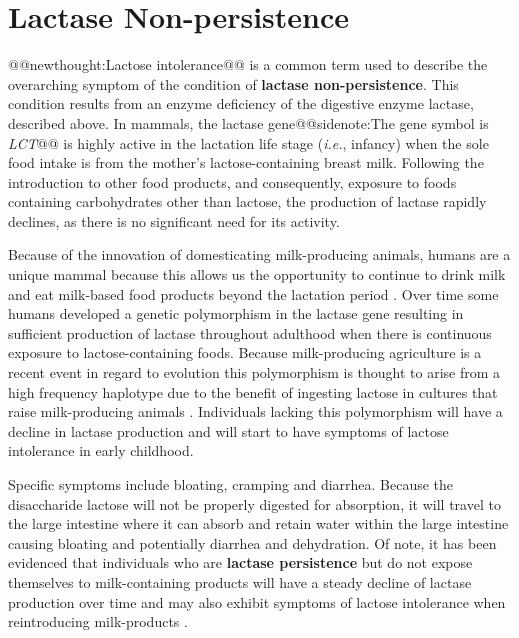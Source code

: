 \documentclass{tufte-handout}
\makeatletter
\def\newthought#1{@@newthought:#1@@}
\def\sidenote#1{@@sidenote:#1@@}
\makeatother
\begin{document}
\section{Lactase Non-persistence}

\newthought{Lactose intolerance} is a common term used to describe the overarching symptom of the condition of \textbf{lactase non-persistence}. This condition results from an enzyme deficiency of the digestive enzyme lactase, described above. In mammals, the lactase gene\sidenote{The gene symbol is \textit{LCT}} is highly active in the lactation life stage (\textit{i.e.}, infancy) when the sole food intake is from the mother's lactose-containing breast milk. Following the introduction to other food products, and consequently, exposure to foods containing carbohydrates other than lactose, the production of lactase rapidly declines, as there is no significant need for its activity.

Because of the innovation of domesticating milk-producing animals, humans are a unique mammal because this allows us the opportunity to
continue to drink milk and eat milk-based food products beyond the lactation period \citep{Itan2009}. Over time some humans developed a genetic polymorphism in the lactase gene resulting in sufficient production of lactase throughout adulthood when there is continuous exposure to lactose-containing foods. Because milk-producing agriculture is a recent event in regard to evolution this polymorphism is thought to arise from a high frequency haplotype due to the benefit of ingesting lactose in cultures that raise milk-producing animals \citep{Harvey1998,Itan2009}. Individuals lacking this polymorphism will have a decline in lactase production and will start to have symptoms of lactose intolerance in early childhood.

Specific symptoms include bloating, cramping and diarrhea. Because the disaccharide lactose will not be properly digested for absorption, it will travel to the large intestine where it can absorb and retain water within the large intestine causing bloating and potentially diarrhea and dehydration. Of note, it has been evidenced that individuals who are \textbf{lactase persistence} but do not expose themselves to milk-containing products will have a steady decline of lactase production over time and may also exhibit symptoms of lactose intolerance when reintroducing milk-products \citep{Gerbault2011}.
\end{document}
